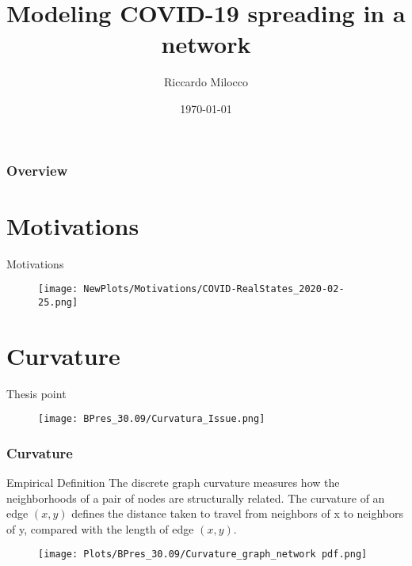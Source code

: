 \documentclass{beamer}
\title[Network Covid-19]{Modeling COVID-19 spreading in a network} %
\author{Riccardo Milocco} %
\institute[UniPD] %
{
University of Padova \\ %
\medskip
\textit{} %
}
\date{\today} %
\begin{document}
\begin{frame}
\titlepage %
\end{frame}

\begin{frame}
\frametitle{Overview} %
\tableofcontents %
\end{frame}

\section{Motivations}
\begin{frame}{Motivations}
	\begin{figure}[h]
		\centering
		\texttt{[image: NewPlots/Motivations/COVID-RealStates\_2020-02-25.png]}
	\end{figure}
\end{frame}

\section{Curvature}
\begin{frame}{Thesis point}
	\begin{figure}
		\texttt{[image: BPres\_30.09/Curvatura\_Issue.png]}
	\end{figure}
\end{frame}

\begin{frame}
	\frametitle{Curvature}
	\begin{block}{Empirical Definition}
		The discrete graph curvature measures how the neighborhoods of a pair of nodes are structurally related. The curvature of an edge $(x, y)$ defines the distance taken to travel from neighbors of x to neighbors of y, compared with the length of edge $(x, y)$.
	\end{block}
	\begin{figure}
		\texttt{[image: Plots/BPres\_30.09/Curvature\_graph\_network pdf.png]}
	\end{figure}
\end{frame}
\end{document}
